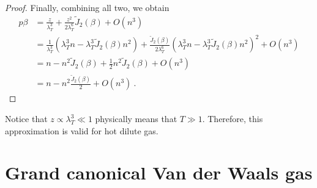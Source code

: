 \begin{proof}
        Finally, combining all two, we obtain 
        \begin{equation*}
        \begin{aligned}
            p \beta & = \frac{z}{\lambda_T^3} + \frac{z^2}{2 \lambda_T^6} \tilde J_2 (\beta) + O(n^3) \\ & = \frac{1}{\lambda_T^3} (\lambda_T^3 n - \lambda^3_T \tilde J_2(\beta) n^2) + \frac{\tilde J_2 (\beta)}{2 \lambda_T^6} ( \lambda_T^3 n - \lambda^3_T \tilde J_2(\beta) n^2)^2 + O(n^3) \\ & = n - n^2 \tilde J_2 (\beta) + \frac{1}{2} n^2 \tilde J_2 (\beta) + O(n^3) \\ & = n - n^2 \frac{\tilde J_2(\beta)}{2} + O(n^3) ~.
        \end{aligned}
        \end{equation*}
    \end{proof}
    Notice that $z \propto \lambda^3_T \ll 1$ physically means that $T \gg 1$. Therefore, this approximation is valid for hot dilute gas.

\section{Grand canonical Van der Waals gas}

